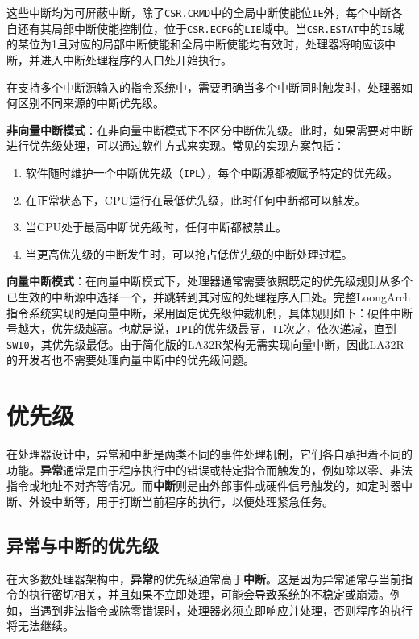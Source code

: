 这些中断均为可屏蔽中断，除了\texttt{CSR.CRMD}中的全局中断使能位\texttt{IE}外，每个中断各自还有其局部中断使能控制位，位于\texttt{CSR.ECFG}的\texttt{LIE}域中。当\texttt{CSR.ESTAT}中的\texttt{IS}域的某位为1且对应的局部中断使能和全局中断使能均有效时，处理器将响应该中断，并进入中断处理程序的入口处开始执行。

在支持多个中断源输入的指令系统中，需要明确当多个中断同时触发时，处理器如何区别不同来源的中断优先级。

\textbf{非向量中断模式}：在非向量中断模式下不区分中断优先级。此时，如果需要对中断进行优先级处理，可以通过软件方式来实现。常见的实现方案包括：

\begin{enumerate}
\item 软件随时维护一个中断优先级（\texttt{IPL}），每个中断源都被赋予特定的优先级。
\item 在正常状态下，CPU运行在最低优先级，此时任何中断都可以触发。
\item 当CPU处于最高中断优先级时，任何中断都被禁止。
\item 当更高优先级的中断发生时，可以抢占低优先级的中断处理过程。
\end{enumerate}


\textbf{向量中断模式}：在向量中断模式下，处理器通常需要依照既定的优先级规则从多个已生效的中断源中选择一个，并跳转到其对应的处理程序入口处。完整LoongArch指令系统实现的是向量中断，采用固定优先级仲裁机制，具体规则如下：硬件中断号越大，优先级越高。也就是说，\texttt{IPI}的优先级最高，\texttt{TI}次之，依次递减，直到\texttt{SWI0}，其优先级最低。由于简化版的LA32R架构无需实现向量中断，因此LA32R的开发者也不需要处理向量中断中的优先级问题。

\section{优先级}\label{sec:07-exceptions-011}

在处理器设计中，异常和中断是两类不同的事件处理机制，它们各自承担着不同的功能。\textbf{异常}通常是由于程序执行中的错误或特定指令而触发的，例如除以零、非法指令或地址不对齐等情况。而\textbf{中断}则是由外部事件或硬件信号触发的，如定时器中断、外设中断等，用于打断当前程序的执行，以便处理紧急任务。

\subsection{异常与中断的优先级}\label{sec:07-exceptions-012}

在大多数处理器架构中，\textbf{异常}的优先级通常高于\textbf{中断}。这是因为异常通常与当前指令的执行密切相关，并且如果不立即处理，可能会导致系统的不稳定或崩溃。例如，当遇到非法指令或除零错误时，处理器必须立即响应并处理，否则程序的执行将无法继续。

